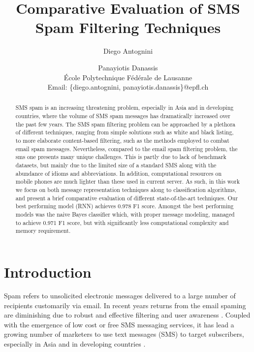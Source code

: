 \documentclass[letterpaper]{article}
\begin{document}
\title{Comparative Evaluation of SMS Spam Filtering Techniques}
\author{Diego Antognini \and Panayiotis Danassis \\
\'Ecole Polytechnique F\'ed\'erale de Lausanne \\
Email: \{diego.antognini, panayiotis.danassis\}@epfl.ch}

\maketitle

\begin{abstract}
	SMS spam is an increasing threatening problem, especially in Asia and in developing countries, where the volume of SMS spam messages has dramatically increased over the past few years. The SMS spam filtering problem can be approached by a plethora of different techniques, ranging from simple solutions such as white and black listing, to more elaborate content-based filtering, such as the methods employed to combat email spam messages. Nevertheless, compared to the email spam filtering problem, the sms one presents many unique challenges. This is partly due to lack of benchmark datasets, but mainly due to the limited size of a standard SMS along with the abundance of idioms and abbreviations. In addition, computational resources on mobile phones are much lighter than these used in current server. As such, in this work we focus on both message representation techniques along to classification algorithms, and present a brief comparative evaluation of different state-of-the-art techniques. Our best performing model (RNN) achieves 0.978 F1 score. Amongst the best performing models was the naive Bayes classifier which, with proper message modeling, managed to achieve 0.971 F1 score, but with significantly less computational complexity and memory requirement.
\end{abstract}

\section{Introduction} \label{Introduction}

Spam refers to unsolicited electronic messages delivered to a large number of recipients customarily via email. In recent years returns from the email spaming are diminishing due to robust and effective filtering and user awareness \cite{delany2012sms}. Coupled with the emergence of low cost or free SMS messaging
services, it has lead a growing number of marketers to use text messages (SMS) to target subscribers, especially in Asia and in developing countries \cite{gomez2006content} \cite{yadav2011smsassassin}.
\end{document}
